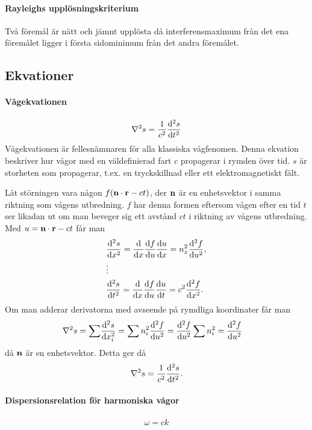 \paragraph{Rayleighs upplösningskriterium}
Två föremål är nätt och jämnt upplösta då interferensmaximum från det ena föremålet ligger i första sidominimum från det andra föremålet.

\subsection{Ekvationer}

\paragraph{Vågekvationen}
\begin{align*}
	\laplacian{s} = \frac{1}{c^2}\dv[2]{s}{t}
\end{align*}
Vågekvationen är fellesnämnaren för alla klassiska vågfenomen. Denna ekvation beskriver hur vågor med en väldefinierad fart $c$ propagerar i rymden över tid. $s$ är storheten som propagerar, t.ex. en tryckskillnad eller ett elektromagnetiskt fält.

\deriv
Låt störningen vara någon $f(\vect{n}\cdot\vect{r} - ct)$, der $\vect{n}$ är en enhetsvektor i samma riktning som vågens utbredning. $f$ har denna formen eftersom vågen efter en tid $t$ ser likadan ut om man beveger sig ett avstånd $ct$ i riktning av vågens utbredning. Med $u = \vect{n}\cdot\vect{r} - ct$ får man
\begin{align*}
	&\dv[2]{s}{x} = \dv{}{x}\dv{f}{u}\dv{u}{x} = n_x^2\dv[2]{f}{u}, \\
	&\vdots \\
	&\dv[2]{s}{t} = \dv{}{x}\dv{f}{u}\dv{u}{t} = c^2\dv[2]{f}{x}.
\end{align*}
Om man adderar derivatorna med avseende på rymdliga koordinater får man
\begin{align*}
	\laplacian{s} = \sum &\dv[2]{s}{x_i} = \sum n_i^2\dv[2]{f}{u} = \dv[2]{f}{u}\sum n_i^2 = \dv[2]{f}{u}
\end{align*}
då $\vect{n}$ är en enhetsvektor. Detta ger då
\begin{align*}
	\laplacian{s} = \frac{1}{c^2}\dv[2]{s}{t}.
\end{align*}

\paragraph{Dispersionsrelation för harmoniska vågor}
\begin{align*}
	\omega = ck
\end{align*}

